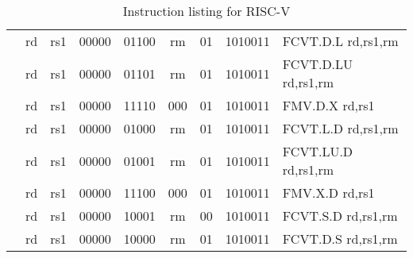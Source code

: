 \begin{table}[p]
\begin{small}
\begin{center}
\begin{tabular}{rccccccccccl}
&
\multicolumn{1}{|c|}{rd} &
\multicolumn{1}{c|}{rs1} &
\multicolumn{1}{c|}{00000} &
\multicolumn{3}{c|}{01100} &
\multicolumn{2}{c|}{rm} &
\multicolumn{1}{c|}{01} &
\multicolumn{1}{c|}{1010011} & FCVT.D.L rd,rs1,rm \\
\cline{2-11}
  

&
\multicolumn{1}{|c|}{rd} &
\multicolumn{1}{c|}{rs1} &
\multicolumn{1}{c|}{00000} &
\multicolumn{3}{c|}{01101} &
\multicolumn{2}{c|}{rm} &
\multicolumn{1}{c|}{01} &
\multicolumn{1}{c|}{1010011} & FCVT.D.LU rd,rs1,rm \\
\cline{2-11}
  

&
\multicolumn{1}{|c|}{rd} &
\multicolumn{1}{c|}{rs1} &
\multicolumn{1}{c|}{00000} &
\multicolumn{3}{c|}{11110} &
\multicolumn{2}{c|}{000} &
\multicolumn{1}{c|}{01} &
\multicolumn{1}{c|}{1010011} & FMV.D.X rd,rs1 \\
\cline{2-11}
  

&
\multicolumn{1}{|c|}{rd} &
\multicolumn{1}{c|}{rs1} &
\multicolumn{1}{c|}{00000} &
\multicolumn{3}{c|}{01000} &
\multicolumn{2}{c|}{rm} &
\multicolumn{1}{c|}{01} &
\multicolumn{1}{c|}{1010011} & FCVT.L.D rd,rs1,rm \\
\cline{2-11}
  

&
\multicolumn{1}{|c|}{rd} &
\multicolumn{1}{c|}{rs1} &
\multicolumn{1}{c|}{00000} &
\multicolumn{3}{c|}{01001} &
\multicolumn{2}{c|}{rm} &
\multicolumn{1}{c|}{01} &
\multicolumn{1}{c|}{1010011} & FCVT.LU.D rd,rs1,rm \\
\cline{2-11}
  

&
\multicolumn{1}{|c|}{rd} &
\multicolumn{1}{c|}{rs1} &
\multicolumn{1}{c|}{00000} &
\multicolumn{3}{c|}{11100} &
\multicolumn{2}{c|}{000} &
\multicolumn{1}{c|}{01} &
\multicolumn{1}{c|}{1010011} & FMV.X.D rd,rs1 \\
\cline{2-11}
  

&
\multicolumn{1}{|c|}{rd} &
\multicolumn{1}{c|}{rs1} &
\multicolumn{1}{c|}{00000} &
\multicolumn{3}{c|}{10001} &
\multicolumn{2}{c|}{rm} &
\multicolumn{1}{c|}{00} &
\multicolumn{1}{c|}{1010011} & FCVT.S.D rd,rs1,rm \\
\cline{2-11}
  

&
\multicolumn{1}{|c|}{rd} &
\multicolumn{1}{c|}{rs1} &
\multicolumn{1}{c|}{00000} &
\multicolumn{3}{c|}{10000} &
\multicolumn{2}{c|}{rm} &
\multicolumn{1}{c|}{01} &
\multicolumn{1}{c|}{1010011} & FCVT.D.S rd,rs1,rm \\
\cline{2-11}
  

\end{tabular}
\end{center}
\end{small}
\caption{Instruction listing for RISC-V}
\label{instr-table}
\end{table}
  

